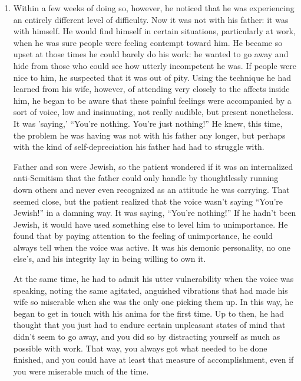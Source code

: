 \begin{enumerate}
\item {} Within a few
weeks of doing so, however, he noticed that he was experiencing an entirely
different level of difficulty. Now it was not with his father: it was with
himself. He would find himself in certain situations, particularly at work,
when he was sure people were feeling contempt toward him. He became so upset at
those times he could barely do his work: he wanted to go away and hide from
those who could see how utterly incompetent he was. If people were nice to him,
he suspected that it was out of pity. Using the technique he had learned from
his wife, however, of attending very closely to the affects inside him, he
began to be aware that these painful feelings were accompanied by a sort of
voice, low and insinuating, not really audible, but present nonetheless. It was
'saying,' ``You're nothing. You're just nothing!'' He knew, this time, the
problem he was having was not with his father any longer, but perhaps with the
kind of self-depreciation his father had had to struggle with.

Father and son were Jewish, so the patient wondered if it was an internalized
anti-Semitism that the father could only handle by thoughtlessly running down
others and never even recognized as an attitude he was carrying. That seemed
close, but the patient realized that the voice wasn't saying ``You're Jewish!''
in a damning way. It was saying, ``You're nothing!'' If he hadn't been Jewish, it
would have used something else to level him to unimportance. He found that by
paying attention to the feeling of unimportance, he could always tell when the
voice was active. It was his demonic personality, no one else's, and his
integrity lay in being willing to own it.

At the same time, he had to admit his utter vulnerability when the voice was
speaking, noting the same agitated, anguished vibrations that had made his wife
so miserable when she was the only one picking them up. In this way, he began
to get in touch with his anima for the first time. Up to then, he had thought
that you just had to endure certain unpleasant states of mind that didn't seem
to go away, and you did so by distracting yourself as much as possible with
work. That way, you always got what needed to be done finished, and you could
have at least that measure of accomplishment, even if you were miserable much
of the time.


\end{enumerate}
